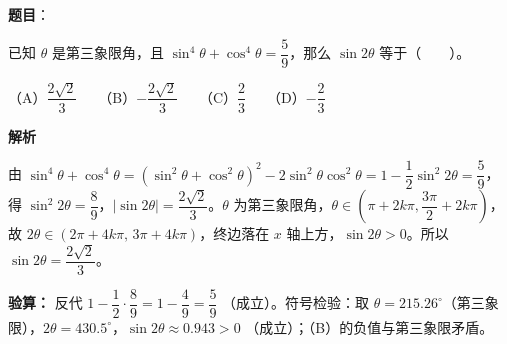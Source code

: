 \begin{answer}

\textbf{题目}：

已知 $\theta$ 是第三象限角，且 $\sin^4\theta+\cos^4\theta=\dfrac59$，那么 $\sin2\theta$ 等于\mbox{（　　）}。

（A）$\dfrac{2\sqrt2}{3}$　　（B）$-\dfrac{2\sqrt2}{3}$　　（C）$\dfrac23$　　（D）$-\dfrac23$

\textbf{解析}

由 $\sin^4\theta+\cos^4\theta=(\sin^2\theta+\cos^2\theta)^2-2\sin^2\theta\cos^2\theta=1-\dfrac12\sin^2 2\theta=\dfrac59$，得 $\sin^2 2\theta=\dfrac89$，$|\sin2\theta|=\dfrac{2\sqrt2}{3}$。$\theta$ 为第三象限角，$\theta\in\left(\pi+2k\pi,\dfrac{3\pi}{2}+2k\pi\right)$，故 $2\theta\in(2\pi+4k\pi,\,3\pi+4k\pi)$，终边落在 $x$ 轴上方，$\sin2\theta>0$。所以 $\sin2\theta=\dfrac{2\sqrt2}{3}$。

\textbf{验算：} 反代 $1-\dfrac12\cdot\dfrac89=1-\dfrac49=\dfrac59$ （成立）。符号检验：取 $\theta=215.26^\circ$（第三象限），$2\theta=430.5^\circ$，$\sin2\theta\approx0.943>0$ （成立）；（B）的负值与第三象限矛盾。


\par\medskip

\end{answer}

